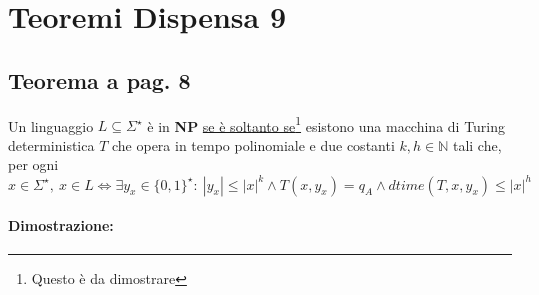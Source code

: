 \section{Teoremi Dispensa 9}

\subsection{Teorema a pag. 8}

Un linguaggio $L \subseteq \Sigma^{\star}$ è in \textbf{NP} \underline{se è soltanto se}\footnote{Questo è da dimostrare}
esistono una macchina di Turing deterministica $T$ che opera in tempo polinomiale e due costanti $k, h \in \mathbb{N}$ tali che, 
per ogni $x \in \Sigma^{\star},\ x \in L \Leftrightarrow \exists y_{x} \in \{0, 1\}^{\star}:\ |y_{x}| \leq |x|^k
\land T(x, y_{x}) = q_{A} \land dtime(T, x, y_{x}) \leq |x|^h$

\paragraph*{Dimostrazione: }

